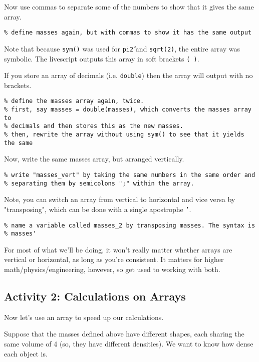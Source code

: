 \documentclass{ximera}
\begin{document}
Now use commas to separate some of the numbers to show that it gives the same array.

\begin{verbatim}
% define masses again, but with commas to show it has the same output
\end{verbatim}

Note that because \texttt{sym()} was used for \texttt{pi\^2} and \texttt{sqrt(2)}, the entire array was symbolic. The livescript outputs this array in soft brackets \texttt{( )}. 

If you store an array of decimals (i.e. \texttt{double}) then the array will output with no brackets.

\begin{verbatim}
% define the masses array again, twice.
% first, say masses = double(masses), which converts the masses array to
% decimals and then stores this as the new masses.
% then, rewrite the array without using sym() to see that it yields the same
\end{verbatim}

Now, write the same masses array, but arranged vertically.

\begin{verbatim}
% write "masses_vert" by taking the same numbers in the same order and
% separating them by semicolons ";" within the array.
\end{verbatim}

Note, you can switch an array from vertical to horizontal and vice versa by "transposing", which can be done with a single apostrophe \texttt{'}. 

\begin{verbatim}
% name a variable called masses_2 by transposing masses. The syntax is
% masses'
\end{verbatim}

For most of what we'll be doing, it won't really matter whether arrays are vertical or horizontal, as long as you're consistent. It matters for higher math/physics/engineering, however, so get used to working with both.

\subsection*{Activity 2: Calculations on Arrays}

Now let's use an array to speed up our calculations.

Suppose that the masses defined above have different shapes, each sharing the same volume of 4 (so, they have different densities). We want to know how dense each object is.
\end{document}
